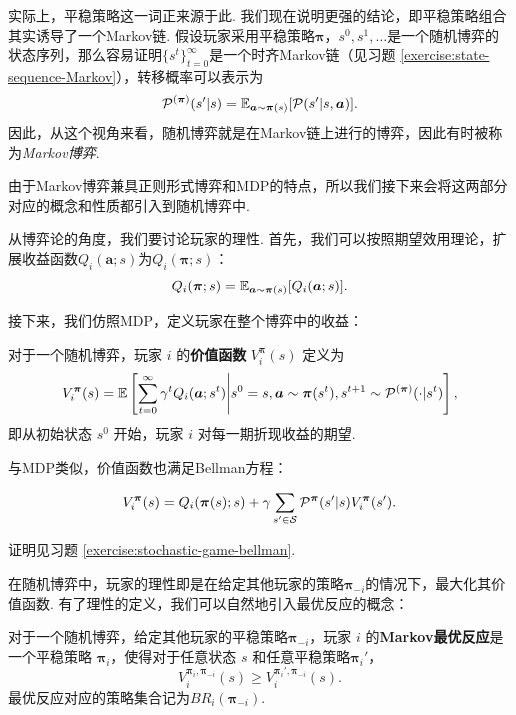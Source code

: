 实际上，平稳策略这一词正来源于此. 我们现在说明更强的结论，即平稳策略组合其实诱导了一个Markov链. 假设玩家采用平稳策略$\boldsymbol \pi$，$s^0,s^1,\dots$是一个随机博弈的状态序列，那么容易证明$\{s^t\}_{t=0}^{\infty}$是一个时齐Markov链（见习题 \ref{exercise:state-sequence-Markov}），转移概率可以表示为
\[\mathcal P^{(\boldsymbol \pi)}(s'|s)=\mathbb{E}_{\boldsymbol a\sim \boldsymbol \pi(s)}[\mathcal P(s'|s,\boldsymbol a)].\]
因此，从这个视角来看，随机博弈就是在Markov链上进行的博弈，因此有时被称为\textit{Markov博弈}.

由于Markov博弈兼具正则形式博弈和MDP的特点，所以我们接下来会将这两部分对应的概念和性质都引入到随机博弈中.

从博弈论的角度，我们要讨论玩家的理性. 首先，我们可以按照期望效用理论，扩展收益函数$Q_i(\boldsymbol a;s)$为$Q_i(\boldsymbol \pi;s)$：
\[Q_i(\boldsymbol \pi;s)=\mathbb{E}_{\boldsymbol a\sim \boldsymbol \pi(s)}[Q_i(\boldsymbol a;s)].\]

接下来，我们仿照MDP，定义玩家在整个博弈中的收益：

\begin{definition}[价值函数]
    对于一个随机博弈，玩家 $i$ 的\textbf{价值函数} $V_i^{\boldsymbol \pi}(s)$ 定义为
    \[V_i^{\boldsymbol \pi}(s) = \mathbb{E}\left[\sum_{t=0}^{\infty} \gamma^t Q_i(\boldsymbol a; s^t)\middle| s^0=s, \boldsymbol a\sim \boldsymbol \pi(s^t), s^{t+1}\sim \mathcal P^{(\boldsymbol \pi)}(\cdot|s^t)\right],\]
    即从初始状态 $s^0$ 开始，玩家 $i$ 对每一期折现收益的期望.
\end{definition}

与MDP类似，价值函数也满足Bellman方程：

\begin{theorem}[Bellman方程]\label{theorem:stochastic-game-bellman}
        \[V_i^{\boldsymbol \pi}(s) = Q_i(\boldsymbol \pi(s);s) + \gamma \sum_{s'\in \mathcal S} \mathcal P^{\boldsymbol\pi}(s'|s)V_i^{\boldsymbol \pi}(s').\]
\end{theorem}
证明见习题 \ref{exercise:stochastic-game-bellman}.

在随机博弈中，玩家的理性即是在给定其他玩家的策略$\boldsymbol \pi_{-i}$的情况下，最大化其价值函数. 有了理性的定义，我们可以自然地引入最优反应的概念：

\begin{definition}[Markov最优反应]
    对于一个随机博弈，给定其他玩家的平稳策略$\boldsymbol \pi_{-i}$，玩家 $i$ 的\textbf{Markov最优反应}是一个平稳策略 $\boldsymbol \pi_i$，使得对于任意状态 $s$ 和任意平稳策略$\boldsymbol \pi_i'$，
    \[V_i^{\boldsymbol \pi_i,\boldsymbol \pi_{-i}}(s)\geq V_i^{\boldsymbol \pi_i',\boldsymbol \pi_{-i}}(s).\]
    最优反应对应的策略集合记为$BR_i(\boldsymbol \pi_{-i})$.
\end{definition}

